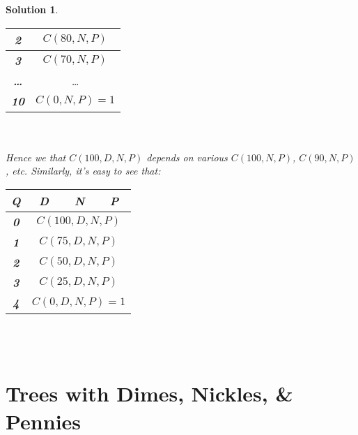\documentclass{article}
\newtheorem*{solution*}{Solution}
\begin{document}
\begin{solution*}
\begin{tabular}{|c|c|c|c|}
    \bottomrule
    \textbf{2} & \multicolumn{3}{|c|}{{$C(80, N, P)$}} \\

    \bottomrule
    \textbf{3} & \multicolumn{3}{|c|}{{$C(70, N, P)$}} \\

    \bottomrule
    \textbf{\dots} & \multicolumn{3}{|c|}{{\dots}} \\

    \bottomrule
    \textbf{10} & \multicolumn{3}{|c|}{{$$C(0, N, P)=1$$}} \\

    \bottomrule
\end{tabular}\\\\

Hence we that $C(100, D, N, P)$ depends on various 
$C(100, N, P)$, $C(90, N, P)$, etc.
Similarly, it's easy to see that:\\

\begin{tabular}{|c|c|c|c|}
    \hline
    Q & D & N & P \\
    \bottomrule
    \textbf{0} & \multicolumn{3}{|c|}{{$$C(100, D, N, P)$$}} \\

    \bottomrule
    \textbf{1} & \multicolumn{3}{|c|}{{$$C(75, D, N, P)$$}} \\

    \bottomrule
    \textbf{2} & \multicolumn{3}{|c|}{{$$C(50, D, N, P)$$}} \\

    \bottomrule
    \textbf{3} & \multicolumn{3}{|c|}{{$$C(25, D, N, P)$$}} \\

    \bottomrule
    \textbf{4} & \multicolumn{3}{|c|}{{$$C(0, D, N, P)=1$$}} \\

    \bottomrule
\end{tabular}\\\\

\newpage
\section{Trees with Dimes, Nickles, \& Pennies}

\begin{figure}[htbp]
\centering
\begin{tikzpicture}[
    grow'=right, %
    level distance=4cm, %
    sibling distance=1cm, %
    every node/.style={
        draw, %
        rounded corners, %
        fill=blue!10, %
        align=center, %
        font=\sffamily\small %
    },
]


\end{tikzpicture}
\end{figure}
\end{solution*}
\end{document}
